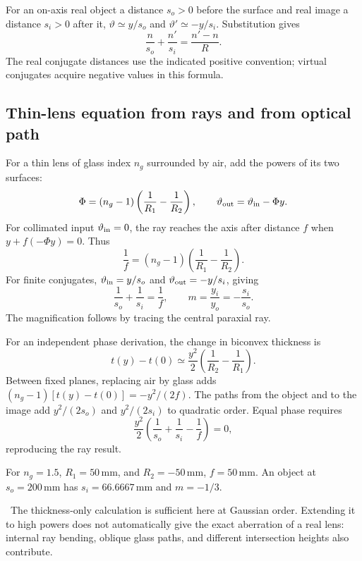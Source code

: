 \documentclass[11pt,a4paper]{article}
\numberwithin{equation}{section}
\newcommand{\caution}[1]{\par\smallskip\noindent{\color{warm}\textbf{Keep distinct.}}\ #1\par\smallskip}
\newcommand{\mm}{\,\mathrm{mm}}
\begin{document}
For an on-axis real object a distance $s_o>0$ before the surface and real
image a distance $s_i>0$ after it,
$\vartheta\simeq y/s_o$ and $\vartheta'\simeq-y/s_i$. Substitution gives
\begin{equation}
 \boxed{\frac{n}{s_o}+\frac{n'}{s_i}=\frac{n'-n}{R}.}
\end{equation}
The real conjugate distances use the indicated positive convention;
virtual conjugates acquire negative values in this formula.

\subsection{Thin-lens equation from rays and from optical path}
For a thin lens of glass index $n_g$ surrounded by air, add the powers
of its two surfaces:
\begin{equation}
 \Phi=(n_g-1)\left(\frac1{R_1}-\frac1{R_2}\right),\qquad
 \vartheta_{\rm out}=\vartheta_{\rm in}-\Phi y.
\end{equation}
For collimated input $\vartheta_{\rm in}=0$, the ray reaches the axis
after distance $f$ when $y+f(-\Phi y)=0$. Thus
\begin{equation}
 \boxed{\frac1f=(n_g-1)\left(\frac1{R_1}-\frac1{R_2}\right).}
\end{equation}
For finite conjugates, $\vartheta_{\rm in}=y/s_o$ and
$\vartheta_{\rm out}=-y/s_i$, giving
\begin{equation}
 \boxed{\frac1{s_o}+\frac1{s_i}=\frac1f,\qquad
 m=\frac{y_i}{y_o}=-\frac{s_i}{s_o}.}
\end{equation}
The magnification follows by tracing the central paraxial ray.

For an independent phase derivation, the change in biconvex thickness is
\[
 t(y)-t(0)\simeq\frac{y^2}{2}\left(\frac1{R_2}-\frac1{R_1}\right).
\]
Between fixed planes, replacing air by glass adds
$(n_g-1)[t(y)-t(0)]=-y^2/(2f)$. The paths from the object and to the image
add $y^2/(2s_o)$ and $y^2/(2s_i)$ to quadratic order. Equal phase requires
\[
 \frac{y^2}{2}\left(\frac1{s_o}+\frac1{s_i}-\frac1f\right)=0,
\]
reproducing the ray result.

For $n_g=1.5$, $R_1=50\mm$, and $R_2=-50\mm$, $f=50\mm$.
An object at $s_o=200\mm$ has $s_i=66.6667\mm$ and $m=-1/3$.

\caution{The thickness-only calculation is sufficient here at Gaussian
order. Extending it to high powers does not automatically give the exact
aberration of a real lens: internal ray bending, oblique glass paths, and
different intersection heights also contribute.}
\end{document}

